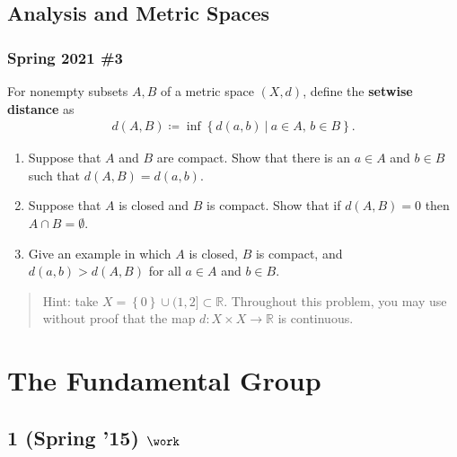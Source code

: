 \hypertarget{analysis-and-metric-spaces}{%
\subsection{Analysis and Metric
Spaces}\label{analysis-and-metric-spaces}}

\hypertarget{spring-2021-3}{%
\subsubsection{Spring 2021 \#3}\label{spring-2021-3}}

\begin{problem}[Spring 2021, 3]

For nonempty subsets \(A, B\) of a metric space \((X, d)\), define the
\textbf{setwise distance} as
\begin{align*}
d(A, B) \coloneqq\inf \left\{{ d(a, b) {~\mathrel{\Big|}~}a\in A,\, b\in B }\right\} 
.\end{align*}

\begin{enumerate}
\def\labelenumi{\alph{enumi}.}
\item
  Suppose that \(A\) and \(B\) are compact. Show that there is an
  \(a\in A\) and \(b\in B\) such that \(d(A, B) = d(a, b)\).
\item
  Suppose that \(A\) is closed and \(B\) is compact. Show that if
  \(d(A, B) = 0\) then \(A \cap B = \emptyset\).
\item
  Give an example in which \(A\) is closed, \(B\) is compact, and
  \(d(a, b) > d(A, B)\) for all \(a\in A\) and \(b\in B\).
\end{enumerate}

\begin{quote}
Hint: take \(X = \left\{{ 0 }\right\} \cup(1, 2] \subset {\mathbb{R}}\).
Throughout this problem, you may use without proof that the map
\(d:X\times X\to {\mathbb{R}}\) is continuous.
\end{quote}

\end{problem}

\hypertarget{the-fundamental-group}{%
\section{The Fundamental Group}\label{the-fundamental-group}}

\hypertarget{spring-15-work}{%
\subsection{\texorpdfstring{1 (Spring '15)
\(\work\)}{1 (Spring '15) \textbackslash work}}\label{spring-15-work}}

